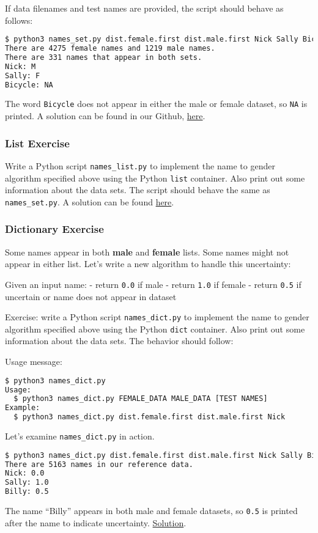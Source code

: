 \documentclass[12pt,letterpaper,twoside]{article}
\begin{document}
If data filenames and test names are provided, the script should behave
as follows:

\begin{lstlisting}[language=bash]
$ python3 names_set.py dist.female.first dist.male.first Nick Sally Bicycle
There are 4275 female names and 1219 male names.
There are 331 names that appear in both sets.
Nick: M
Sally: F
Bicycle: NA
\end{lstlisting}

The word \texttt{Bicycle} does not appear in either the male or female
dataset, so \texttt{NA} is printed. 
A solution can be found in our Github, \href{https://github.com/CME211/notes/blob/fall_18/lecture-03/names_set.py}{here}.

\subsubsection{List Exercise}
Write a Python script \texttt{names\_list.py} to implement the
name to gender algorithm specified above using the Python \texttt{list}
container. Also print out some information about the data sets.
The script should behave the same as \texttt{names\_set.py}. A solution can
be found \href{https://github.com/CME211/notes/blob/fall_18/lecture-03/names_list.py}{here}.

\subsubsection{Dictionary Exercise}
Some names appear in both \textbf{male} and \textbf{female} lists. Some
names might not appear in either list. Let's write a new algorithm to
handle this uncertainty:

Given an input name: - return \texttt{0.0} if male - return \texttt{1.0}
if female - return \texttt{0.5} if uncertain or name does not appear in
dataset

Exercise: write a Python script \texttt{names\_dict.py} to implement the
name to gender algorithm specified above using the Python \texttt{dict}
container. Also print out some information about the data sets. The
behavior should follow:

Usage message:

\begin{lstlisting}[language=bash]
$ python3 names_dict.py
Usage:
  $ python3 names_dict.py FEMALE_DATA MALE_DATA [TEST NAMES]
Example:
  $ python3 names_dict.py dist.female.first dist.male.first Nick
\end{lstlisting}

Let's examine \texttt{names\_dict.py} in action.

\begin{lstlisting}[language=bash]
$ python3 names_dict.py dist.female.first dist.male.first Nick Sally Billy
There are 5163 names in our reference data.
Nick: 0.0
Sally: 1.0
Billy: 0.5
\end{lstlisting}

The name ``Billy'' appears in both male and female datasets, so
\texttt{0.5} is printed after the name to indicate uncertainty.
\href{https://github.com/CME211/notes/blob/fall_18/lecture-03/names_dict.py}{Solution}.
\end{document}
